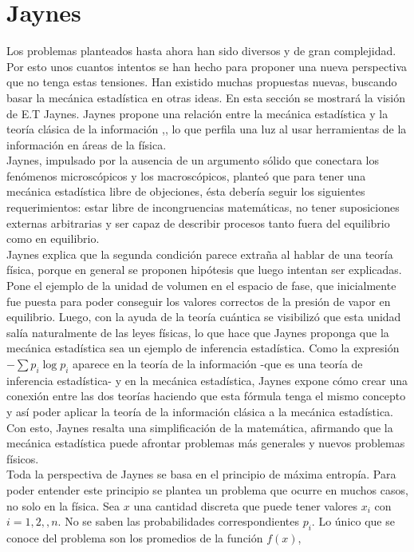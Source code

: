 \section{Jaynes}
Los problemas planteados hasta ahora han sido diversos y de gran complejidad. Por esto unos cuantos intentos se han hecho para proponer una nueva perspectiva que no tenga estas tensiones. Han existido muchas propuestas nuevas, buscando basar la mecánica estadística en otras ideas. En esta sección se mostrará la visión de E.T Jaynes. Jaynes propone una relación entre la mecánica estadística y la teoría clásica de la información \cite{JaynesI},\cite{JaynesII}, lo que perfila una luz al usar herramientas de la información en áreas de la física.
\\
Jaynes, impulsado por la ausencia de un argumento sólido que conectara los fenómenos microscópicos y los macroscópicos, planteó que para tener una mecánica estadística libre de objeciones, ésta debería seguir los siguientes requerimientos: estar libre de incongruencias matemáticas, no tener suposiciones externas arbitrarias y ser capaz de describir procesos tanto fuera del equilibrio como en equilibrio.
\\
Jaynes explica que la segunda condición parece extraña al hablar de una teoría física, porque en general se proponen hipótesis que luego intentan ser explicadas. Pone el ejemplo de la unidad de volumen en el espacio de fase, que inicialmente fue puesta para poder conseguir los valores correctos de la presión de vapor en equilibrio. Luego, con la ayuda de la teoría cuántica se visibilizó que esta unidad salía naturalmente de las leyes físicas, lo que hace que Jaynes proponga que la mecánica estadística sea un ejemplo de inferencia estadística. Como la expresión $- \sum p_{i} \log p_{i}$ aparece en la teoría de la información -que es una teoría de inferencia estadística- y en la mecánica estadística, Jaynes expone cómo crear una conexión entre las dos teorías haciendo que esta fórmula tenga el mismo concepto y así poder aplicar la teoría de la información clásica a la mecánica estadística. Con esto, Jaynes resalta  una simplificación de la matemática, afirmando que la mecánica estadística puede afrontar problemas más generales y nuevos problemas físicos.
\\
Toda la perspectiva de Jaynes se basa en el principio de máxima entropía. Para poder entender este principio se plantea un problema que ocurre en muchos casos, no solo en la física. Sea $x$ una cantidad discreta que puede tener valores $x_{i}$ con $i=1, 2,,n$. No se saben las probabilidades correspondientes $p_{i}$. Lo único que se conoce del problema son los promedios de la función $f(x)$,
